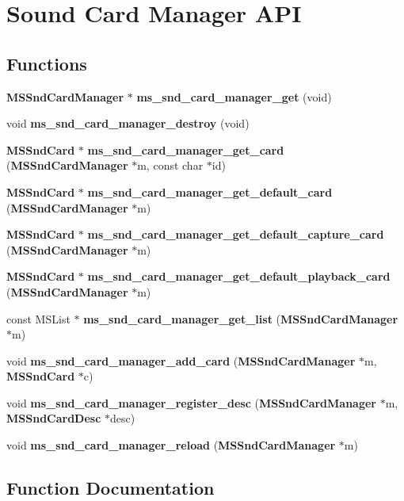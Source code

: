\section{Sound Card Manager API}
\label{group__mediastreamer2__soundcardmanager}
\subsection*{Functions}
\begin{DoxyCompactItemize}
\item 
{\bf MSSndCardManager} $\ast$ {\bf ms\_\-snd\_\-card\_\-manager\_\-get} (void)
\item 
void {\bf ms\_\-snd\_\-card\_\-manager\_\-destroy} (void)
\item 
{\bf MSSndCard} $\ast$ {\bf ms\_\-snd\_\-card\_\-manager\_\-get\_\-card} ({\bf MSSndCardManager} $\ast$m, const char $\ast$id)
\item 
{\bf MSSndCard} $\ast$ {\bf ms\_\-snd\_\-card\_\-manager\_\-get\_\-default\_\-card} ({\bf MSSndCardManager} $\ast$m)
\item 
{\bf MSSndCard} $\ast$ {\bf ms\_\-snd\_\-card\_\-manager\_\-get\_\-default\_\-capture\_\-card} ({\bf MSSndCardManager} $\ast$m)
\item 
{\bf MSSndCard} $\ast$ {\bf ms\_\-snd\_\-card\_\-manager\_\-get\_\-default\_\-playback\_\-card} ({\bf MSSndCardManager} $\ast$m)
\item 
const MSList $\ast$ {\bf ms\_\-snd\_\-card\_\-manager\_\-get\_\-list} ({\bf MSSndCardManager} $\ast$m)
\item 
void {\bf ms\_\-snd\_\-card\_\-manager\_\-add\_\-card} ({\bf MSSndCardManager} $\ast$m, {\bf MSSndCard} $\ast$c)
\item 
void {\bf ms\_\-snd\_\-card\_\-manager\_\-register\_\-desc} ({\bf MSSndCardManager} $\ast$m, {\bf MSSndCardDesc} $\ast$desc)
\item 
void {\bf ms\_\-snd\_\-card\_\-manager\_\-reload} ({\bf MSSndCardManager} $\ast$m)
\end{DoxyCompactItemize}


\subsection{Function Documentation}
